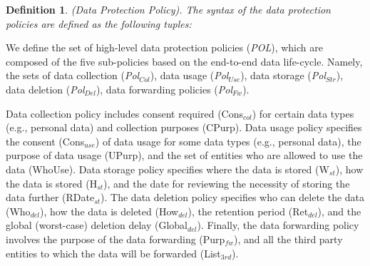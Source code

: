 \documentclass[a4paper]{article}
\newtheorem{ttd}{Definition}
\begin{document}
\begin{ttd}
(Data Protection Policy). The syntax of the data protection policies are defined as the following tuples:   

\begin{figure}[htbp]
\centering
{}
\label{fig:dcpol}
\end{figure}
\end{ttd}

We define the set of high-level data protection policies (\textit{POL}), which are composed of the five sub-policies based on the end-to-end data life-cycle. Namely, the sets of data collection (\textit{Pol}$_{Col}$), data usage  (\textit{Pol}$_{Use}$), data storage (\textit{Pol}$_{Str}$), data deletion (\textit{Pol}$_{Del}$), data forwarding policies (\textit{Pol}$_{Fw}$). 

Data collection policy includes consent required (Cons$_{col}$) for certain data types (e.g., personal data) and collection purposes (CPurp). Data usage policy specifies the  consent (Cons$_{use}$) of data usage for some data types (e.g., personal data), the purpose of data usage (UPurp), and the set of entities who are allowed to use the data (WhoUse). Data storage policy specifies where the data is stored (W$_{st}$), how the data is stored (H$_{st}$), and the date for reviewing the necessity of storing the data further (RDate$_{st}$). The data deletion policy specifies who can delete the data (Who$_{del}$), how the data is deleted (How$_{del}$), the retention period (Ret$_{del}$), and the global (worst-case) deletion delay (Global$_{del}$). Finally, the data forwarding policy involves the purpose of the data forwarding (Purp$_{fw}$), and all the third party entities to which the data will be forwarded (List$_{3rd}$).   
\end{document}
